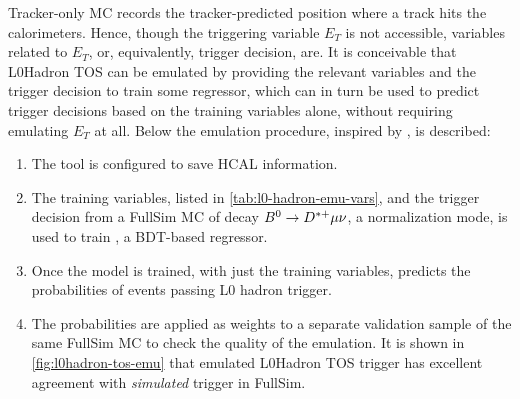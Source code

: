 Tracker-only MC records the tracker-predicted position where a track hits the
calorimeters.
Hence, though the triggering variable $E_T$ is not accessible,
variables related to $E_T$, or, equivalently, trigger decision, are.
It is conceivable that L0Hadron TOS can be emulated by providing
the relevant variables and the trigger decision to train some regressor,
which can in turn be used to predict trigger decisions based on the training
variables alone, without requiring emulating $E_T$ at all.
Below the emulation procedure, inspired by \cite{LHCb-INT-2019-025}, is
described:

\begin{enumerate}
    \item The  tool is configured to save HCAL
        information.
    \item The training variables, listed in \cref{tab:l0-hadron-emu-vars}, and
        the trigger decision from a FullSim MC of decay
        ${{B}^0} \rightarrow {\ensuremath{{D}^{*+}}} \mu \nu$, a normalization mode,
        is used to train \xgboost, a BDT-based regressor.
    \item Once the model is trained, with just the training variables,
        \xgboost predicts the probabilities of events passing L0 hadron trigger.
    \item The probabilities are applied as weights to a separate validation
        sample of the same FullSim MC to check the quality of the emulation.
        It is shown in \cref{fig:l0hadron-tos-emu} that emulated L0Hadron TOS
        trigger has excellent agreement with \emph{simulated} trigger in
        FullSim.
\end{enumerate}

